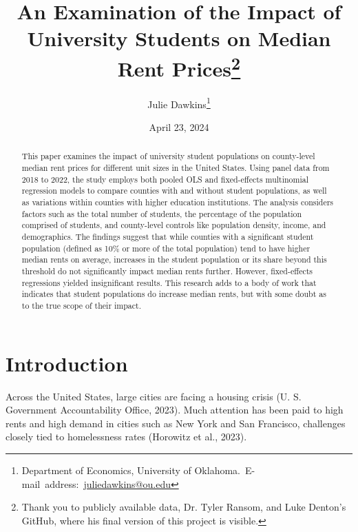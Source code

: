 \documentclass[12pt,english]{article}
\begin{document}
\begin{singlespace}
\title{An Examination of the Impact of University Students on Median Rent Prices\thanks{Thank you to publicly available data, Dr. Tyler Ransom, and Luke Denton's GitHub, where his final version of this project is visible.}}
\end{singlespace}

\author{Julie Dawkins\thanks{Department of Economics, University of Oklahoma.\
E-mail~address:~\href{mailto:juliedawkins@ou.edu}{juliedawkins@ou.edu}}}

\date{April 23, 2024}

\maketitle

\begin{abstract}
\begin{singlespace}
This paper examines the impact of university student populations on county-level median rent prices for different unit sizes in the United States. Using panel data from 2018 to 2022, the study employs both pooled OLS and fixed-effects multinomial regression models to compare counties with and without student populations, as well as variations within counties with higher education institutions. The analysis considers factors such as the total number of students, the percentage of the population comprised of students, and county-level controls like population density, income, and demographics. The findings suggest that while counties with a significant student population (defined as 10\% or more of the total population) tend to have higher median rents on average, increases in the student population or its share beyond this threshold do not significantly impact median rents further. However, fixed-effects regressions yielded insignificant results. This research adds to a body of work that indicates that student populations do increase median rents, but with some doubt as to the true scope of their impact.
\end{singlespace}

\end{abstract}
\vfill{}


\pagebreak{}


\section{Introduction}\label{sec:intro}
Across the United States, large cities are facing a housing crisis (U. S. Government Accountability Office, 2023). Much attention has been paid to high rents and high demand in cities such as New York and San Francisco, challenges closely tied to homelessness rates (Horowitz et al., 2023).
\end{document}
